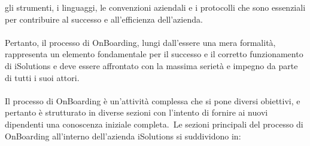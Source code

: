 gli strumenti, i linguaggi, le convenzioni aziendali e i protocolli che sono essenziali per contribuire al successo e 
all'efficienza dell'azienda.
\\ \\
Pertanto, il processo di OnBoarding, lungi dall'essere una mera formalità, rappresenta un elemento fondamentale per il successo 
e il corretto funzionamento di iSolutions e deve essere affrontato con la massima serietà e impegno da parte di tutti i suoi attori.
\\ \\
Il processo di OnBoarding è un'attività complessa che si pone diversi obiettivi, 
e pertanto è strutturato in diverse sezioni con l'intento di fornire ai nuovi 
dipendenti una conoscenza iniziale completa.\ Le sezioni principali del processo di OnBoarding all'interno dell'azienda iSolutions si suddividono in:
